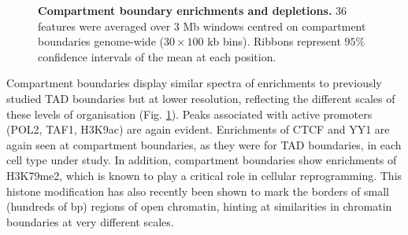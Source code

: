 \documentclass[a4paper,11pt,oneside]{book}
\begin{document}
\begin{figure}
\begin{center} 
\captionsetup{width=\textwidth}
\caption[Compartment boundary enrichments and depletions.]{ {\bf Compartment boundary enrichments and depletions.}
36 features were averaged over 3 Mb windows centred on compartment boundaries genome-wide ($30 \times 100$ kb bins). Ribbons represent $95\%$ confidence intervals of the mean at each position.
}\label{fig:allcompartments}
\end{center}
\end{figure} 

Compartment boundaries display similar
spectra of enrichments to previously studied TAD boundaries
\cite{Dixon2012} but at lower resolution, reflecting the different
scales of these levels of organisation (Fig. \ref{fig:allcompartments}). 
Peaks associated with active promoters (POL2, TAF1, H3K9ac) are again
evident. Enrichments of CTCF and YY1 are again seen
at compartment boundaries, as they were for TAD boundaries, in each
cell type under study. In addition, compartment boundaries show
enrichments of H3K79me2, which is known to play a critical role in
cellular reprogramming.\cite{Onder2012} This histone modification has
also recently been shown to mark the borders of small (hundreds of bp)
regions of open chromatin,\cite{Chai2013} hinting at similarities in chromatin boundaries at very different scales.
\end{document}
